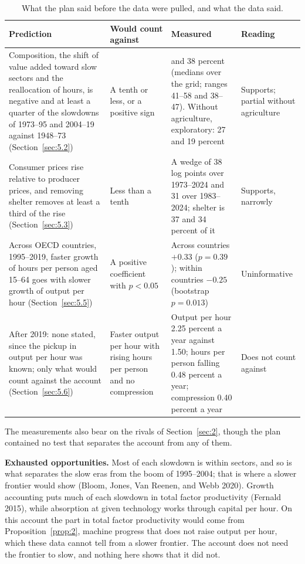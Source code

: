 \documentclass[12pt]{article}
\theoremstyle{plain}
\begin{document}
\begin{table}[t]
\centering
\caption{What the plan said before the data were pulled, and what the data said.}
\label{tab:pred}
\footnotesize
\renewcommand{\arraystretch}{1.15}
\begin{tabular}{@{}>{\raggedright\arraybackslash}p{}>{\raggedright\arraybackslash}p{}>{\raggedright\arraybackslash}p{}>{\raggedright\arraybackslash}p{}@{}}
\toprule
Prediction & Would count against & Measured & Reading \\
\midrule
Composition, the shift of value added toward slow sectors and the reallocation of hours, is negative and at least a quarter of the slowdowns of 1973--95 and 2004--19 against 1948--73 (Section~\ref{sec:5.2}) & A tenth or less, or a positive sign & 47 and 38 percent (medians over the grid; ranges 41--58 and 38--47). Without agriculture, exploratory: 27 and 19 percent & Supports; partial without agriculture \\
\addlinespace
Consumer prices rise relative to producer prices, and removing shelter removes at least a third of the rise (Section~\ref{sec:5.3}) & Less than a tenth & A wedge of 38 log points over 1973--2024 and 31 over 1983--2024; shelter is 37 and 34 percent of it & Supports, narrowly \\
\addlinespace
Across OECD countries, 1995--2019, faster growth of hours per person aged 15--64 goes with slower growth of output per hour (Section~\ref{sec:5.5}) & A positive coefficient with $p<0.05$ & Across countries $+0.33$ ($p=0.39$); within countries $-0.25$ (bootstrap $p=0.013$) & Uninformative \\
\addlinespace
After 2019: none stated, since the pickup in output per hour was known; only what would count against the account (Section~\ref{sec:5.6}) & Faster output per hour with rising hours per person and no compression & Output per hour 2.25 percent a year against 1.50; hours per person falling 0.48 percent a year; compression 0.40 percent a year & Does not count against \\
\bottomrule
\end{tabular}
\end{table}

The measurements also bear on the rivals of Section~\ref{sec:2}, though the plan contained no test that separates the account from any of them.

\textbf{Exhausted opportunities.} Most of each slowdown is within sectors, and so is what separates the slow eras from the boom of 1995--2004; that is where a slower frontier would show (Bloom, Jones, Van Reenen, and Webb 2020). Growth accounting puts much of each slowdown in total factor productivity (Fernald 2015), while absorption at given technology works through capital per hour. On this account the part in total factor productivity would come from Proposition~\ref{prop:2}, machine progress that does not raise output per hour, which these data cannot tell from a slower frontier. The account does not need the frontier to slow, and nothing here shows that it did not.
\end{document}
